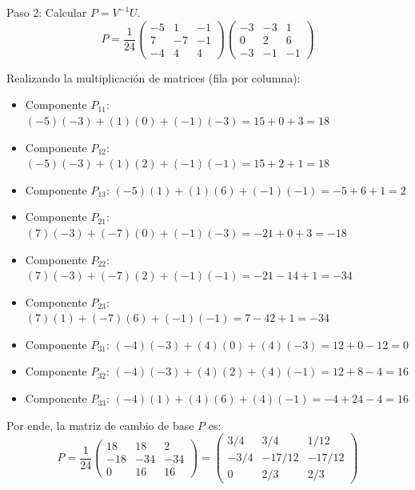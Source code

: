 \documentclass[11pt,spanish]{article}
\begin{document}
\begin{itemize}
Paso 2: Calcular $P = V^{-1} U$.
$$P = \frac{1}{24} \begin{pmatrix} -5 & 1 & -1 \\ 7 & -7 & -1 \\ -4 & 4 & 4 \end{pmatrix} \begin{pmatrix} -3 & -3 & 1 \\ 0 & 2 & 6 \\ -3 & -1 & -1 \end{pmatrix}$$

Realizando la multiplicación de matrices (fila por columna):
\begin{itemize}
\item Componente $P_{11}$: $(-5)(-3) + (1)(0) + (-1)(-3) = 15 + 0 + 3 = 18$
\item Componente $P_{12}$: $(-5)(-3) + (1)(2) + (-1)(-1) = 15 + 2 + 1 = 18$
\item Componente $P_{13}$: $(-5)(1) + (1)(6) + (-1)(-1) = -5 + 6 + 1 = 2$
\item Componente $P_{21}$: $(7)(-3) + (-7)(0) + (-1)(-3) = -21 + 0 + 3 = -18$
\item Componente $P_{22}$: $(7)(-3) + (-7)(2) + (-1)(-1) = -21 - 14 + 1 = -34$
\item Componente $P_{23}$: $(7)(1) + (-7)(6) + (-1)(-1) = 7 - 42 + 1 = -34$
\item Componente $P_{31}$: $(-4)(-3) + (4)(0) + (4)(-3) = 12 + 0 - 12 = 0$
\item Componente $P_{32}$: $(-4)(-3) + (4)(2) + (4)(-1) = 12 + 8 - 4 = 16$
\item Componente $P_{33}$: $(-4)(1) + (4)(6) + (4)(-1) = -4 + 24 - 4 = 16$
\end{itemize}

Por ende, la matriz de cambio de base $P$ es:
$$P = \frac{1}{24} \begin{pmatrix} 18 & 18 & 2 \\ -18 & -34 & -34 \\ 0 & 16 & 16 \end{pmatrix} = \begin{pmatrix} 3/4 & 3/4 & 1/12 \\ -3/4 & -17/12 & -17/12 \\ 0 & 2/3 & 2/3 \end{pmatrix}$$


\end{itemize}
\end{document}
